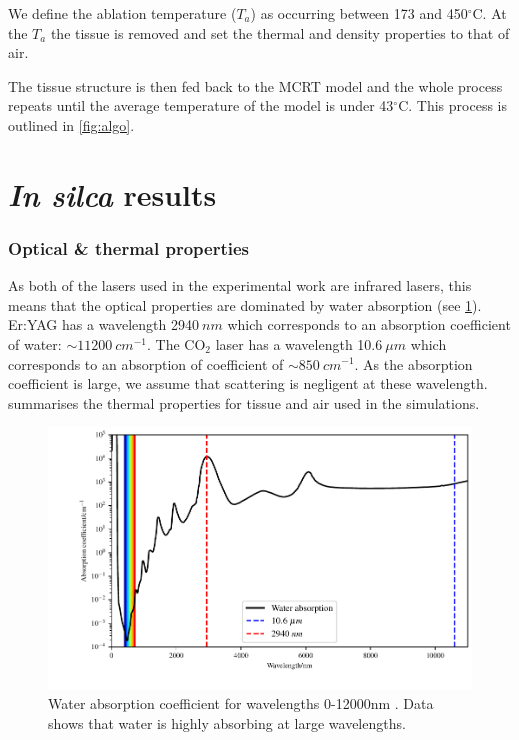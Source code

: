 We define the ablation temperature ($T_a$) as occurring between 173 and 450$^{\circ}$C\cite{gerstmann1994char}. At the $T_a$ the tissue is removed and set the thermal and density properties to that of air.

The tissue structure is then fed back to the MCRT model and the whole process repeats until the average temperature of the model is under 43$^{\circ}$C. This process is outlined in \cref{fig:algo}.

\section{\textit{In silca} results}
 
\subsubsection{Optical \& thermal properties}

As both of the lasers used in the experimental work are infrared lasers, this means that the optical properties are dominated by water absorption (see \cref{fig:waterabsor}). Er:YAG has a wavelength 2940$~nm$ which corresponds to an absorption coefficient of water: $\sim 11200~cm^{-1}$. The CO$_2$ laser has a wavelength 10.6$~\mu m$ which corresponds to an absorption of coefficient of $\sim 850~cm^{-1}$. As the absorption coefficient is large, we assume that scattering is negligent at these wavelength.
 summarises the thermal properties for tissue and air used in the simulations.  

\begin{figure}	
\vspace{-20pt}
	\centering
	\includegraphics[width=\columnwidth]{./ablation/images/water.pdf}
	\caption{Water absorption coefficient for wavelengths 0-12000nm \cite{segelstein1981complex}. Data shows that water is highly absorbing at large wavelengths.}
	\label{fig:waterabsor}
	\vspace{-10pt}
\end{figure}

